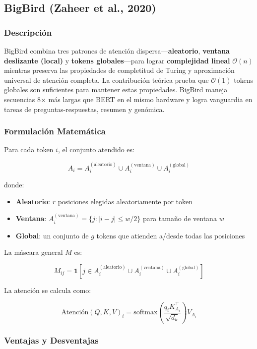 \documentclass[11pt,a4paper]{article}
\begin{document}
\subsection{BigBird (Zaheer et al., 2020)}

\subsubsection{Descripción}

BigBird combina tres patrones de atención dispersa—\textbf{aleatorio}, \textbf{ventana deslizante (local)} y \textbf{tokens globales}—para lograr \textbf{complejidad lineal} $\mathcal{O}(n)$ mientras preserva las propiedades de completitud de Turing y aproximación universal de atención completa. La contribución teórica prueba que $\mathcal{O}(1)$ tokens globales son suficientes para mantener estas propiedades. BigBird maneja secuencias 8× más largas que BERT en el mismo hardware y logra vanguardia en tareas de preguntas-respuestas, resumen y genómica.

\subsubsection{Formulación Matemática}

Para cada token $i$, el conjunto atendido es:

$$
A_i = A_i^{(\text{aleatorio})} \cup A_i^{(\text{ventana})} \cup A_i^{(\text{global})}
$$

donde:

\begin{itemize}[leftmargin=*]
\item \textbf{Aleatorio}: $r$ posiciones elegidas aleatoriamente por token
\item \textbf{Ventana}: $A_i^{(\text{ventana})} = \{j : |i - j| \leq w/2\}$ para tamaño de ventana $w$
\item \textbf{Global}: un conjunto de $g$ tokens que atienden a/desde todas las posiciones
\end{itemize}

La máscara general $M$ es:

$$
M_{ij} = \mathbf{1}\!\left[j \in A_i^{(\text{aleatorio})} \cup A_i^{(\text{ventana})} \cup A_i^{(\text{global})}\right]
$$

La atención se calcula como:

$$
\text{Atención}(Q, K, V)_i = \text{softmax}\!\left(\frac{q_i K_{A_i}^\top}{\sqrt{d_k}}\right) V_{A_i}
$$

\subsubsection{Ventajas y Desventajas}
\end{document}
